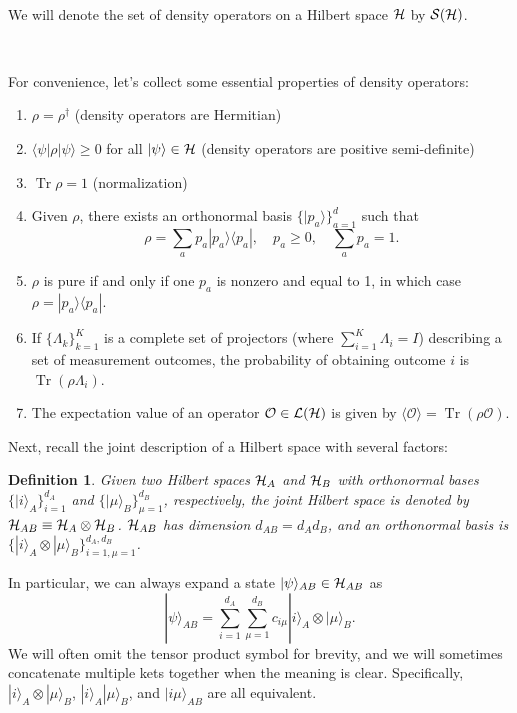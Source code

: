 \documentclass[a4paper,11pt]{article}
\newtheorem{defn}[thm]{Definition}
\DeclareMathOperator{\Tr}{Tr}
\newcommand{\bra}[1]{\langle #1|}
\newcommand{\ket}[1]{|#1\rangle}
\newcommand{\ketbra}[2]{| #1 \rangle \langle #2 |}
\newcommand{\Hil}{{\cal H}}
\newcommand{\Oh}{{\mathcal{O}}}
\newcommand{\Lin}{{\mathcal{L}}}
\newcommand{\Note}{\noindent {\bf Note:~}}
\begin{document}
~

\Note We will denote the set of density operators on a Hilbert space $\Hil$ by ${\cal S}(\Hil)$. 

~

\noindent For convenience, let's collect some essential properties of density operators:
\begin{enumerate}
\item $\rho = \rho^\dagger$ (density operators are Hermitian)
\item $\bra{\psi} \rho \ket{\psi} \geq 0$ for all $\ket{\psi} \in \Hil$ (density operators are positive semi-definite)
\item $\Tr \rho = 1$ (normalization)
\item Given $\rho$, there exists an orthonormal basis $\{ \ket{p_a} \}_{a=1}^d$ such that
\begin{equation*}
\rho = \sum_{a} p_a \ketbra{p_a}{p_a}, \quad p_a \geq 0, \quad \sum_a p_a = 1.
\end{equation*}
\item $\rho$ is pure if and only if one $p_a$ is nonzero and equal to 1, in which case $\rho = \ketbra{p_a}{p_a}$.
\item If $\{\Lambda_k\}_{k = 1}^{K}$ is a complete set of projectors (where $\sum_{i=1}^K \Lambda_i = I$) describing a set of measurement outcomes, the probability of obtaining outcome $i$ is $\Tr(\rho \Lambda_i)$.
\item The expectation value of an operator $\Oh \in \Lin(\Hil)$ is given by $\langle \Oh \rangle = \Tr(\rho \Oh)$.
\end{enumerate}

\noindent Next, recall the joint description of a Hilbert space with several factors:

\begin{defn}
Given two Hilbert spaces $\Hil_A$ and $\Hil_B$ with orthonormal bases $\{ \ket{i}_A \}_{i=1}^{d_A}$ and $\{ \ket{\mu}_B \}_{\mu=1}^{d_B}$, respectively, the \emph{joint Hilbert space} is denoted by $\Hil_{AB} \equiv \Hil_A \otimes \Hil_B$. $\Hil_{AB}$ has dimension $d_{AB} = d_A d_B$, and an orthonormal basis is $\{\ket{i}_A \otimes \ket{\mu}_B \}_{i=1, \mu = 1}^{d_A, d_B}$.
\end{defn}

\noindent In particular, we can always expand a state $\ket{\psi}_{AB} \in \Hil_{AB}$ as
\begin{equation}
\ket{\psi}_{AB} = \sum_{i = 1}^{d_A} \sum_{\mu = 1}^{d_B} c_{i\mu} \ket{i}_A \otimes \ket{\mu}_B.
\end{equation}
We will often omit the tensor product symbol for brevity, and we will sometimes concatenate multiple kets together when the meaning is clear.
Specifically, $\ket{i}_A \otimes \ket{\mu}_B$, $\ket{i}_A \ket{\mu}_B$, and $\ket{i\mu}_{AB}$ are all equivalent.
\end{document}
